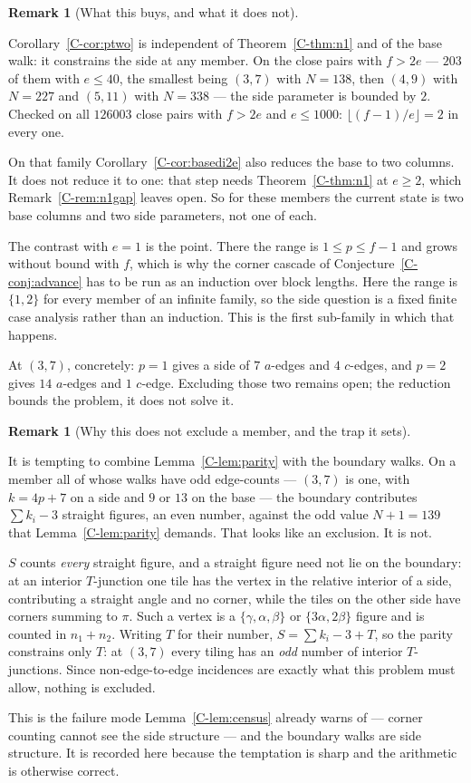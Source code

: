 \documentclass[11pt,reqno]{amsart}
\theoremstyle{plain}
\theoremstyle{definition}
\newtheorem{remark}[theorem]{Remark}
\begin{document}
\begin{remark}[What this buys, and what it does not]\label{O-ptwoscope}

Corollary~\ref{C-cor:ptwo} is independent of Theorem~\ref{C-thm:n1} and of the base walk: it
constrains the side at any member. On the close pairs
with $f>2e$ --- $203$ of them with $e\le40$, the smallest being $(3,7)$ with $N=138$, then $(4,9)$
with $N=227$ and $(5,11)$ with $N=338$ --- the side parameter is bounded by $2$. Checked on all
$126003$ close pairs with $f>2e$ and $e\le1000$: $\lfloor(f-1)/e\rfloor=2$ in every one.

On that family Corollary~\ref{C-cor:basedi2e} also reduces the base to two columns. It does not reduce
it to one: that step needs Theorem~\ref{C-thm:n1} at $e\ge2$, which Remark~\ref{C-rem:n1gap} leaves open.
So for these members the current state is two base columns and two side parameters, not one of each.

The contrast with $e=1$ is the point. There the range is $1\le p\le f-1$ and grows without bound
with $f$, which is why the corner cascade of Conjecture~\ref{C-conj:advance} has to be run as an
induction over block lengths. Here the range is $\{1,2\}$ for every member of an infinite family, so
the side question is a fixed finite case analysis rather than an induction. This is the first
sub-family in which that happens.

At $(3,7)$, concretely: $p=1$ gives a side of $7$ $a$-edges and $4$ $c$-edges, and $p=2$ gives $14$
$a$-edges and $1$ $c$-edge. Excluding those two remains open; the reduction bounds the problem, it
does not solve it.
\end{remark}

\begin{remark}[Why this does not exclude a member, and the trap it sets]\label{O-parityscope}

It is tempting to combine Lemma~\ref{C-lem:parity} with the boundary walks. On a member all of whose
walks have odd edge-counts --- $(3,7)$ is one, with $k=4p+7$ on a side and $9$ or $13$ on the base
--- the boundary contributes $\sum k_i-3$ straight figures, an even number, against the odd value
$N+1=139$ that Lemma~\ref{C-lem:parity} demands. That looks like an exclusion. It is not.

$S$ counts \emph{every} straight figure, and a straight figure need not lie on the boundary: at an
interior $T$-junction one tile has the vertex in the relative interior of a side, contributing a
straight angle and no corner, while the tiles on the other side have corners summing to $\pi$. Such a
vertex is a $\{\gamma,\alpha,\beta\}$ or $\{3\alpha,2\beta\}$ figure and is counted in $n_1+n_2$.
Writing $T$ for their number, $S=\sum k_i-3+T$, so the parity constrains only $T$: at $(3,7)$ every
tiling has an \emph{odd} number of interior $T$-junctions. Since non-edge-to-edge incidences are
exactly what this problem must allow, nothing is excluded.

This is the failure mode Lemma~\ref{C-lem:census} already warns of --- corner counting cannot see the
side structure --- and the boundary walks are side structure. It is recorded here because the
temptation is sharp and the arithmetic is otherwise correct.
\end{remark}
\end{document}
